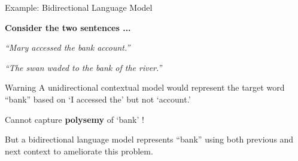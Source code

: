 \begin{frame}{Example: Bidirectional Language Model}


{\large \textbf{Consider the two sentences ...}


\textit{``Mary accessed the bank account.”} 

\textit{``The swan waded to the bank of the river.”}

}

\begin{alertBlock}{Warning}
    \large 
    A unidirectional contextual model would represent the target word “bank” based on `I accessed the’ but not `account.’ 
    
    Cannot capture \textbf{polysemy} of `bank’ !
\end{alertBlock}



{\large But a bidirectional language model represents ``bank” using both previous and next context to ameliorate this problem.}
    
\end{frame}